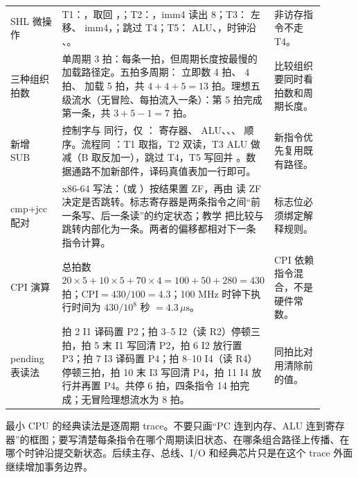 \begin{longtable}{L{0.18\linewidth}L{0.5\linewidth}L{0.22\linewidth}}
SHL 微操作 & T1：，取回 ，；T2：，imm4 读出 8；T3： 左移、 imm4，；跳过 T4；T5： ALU、，时钟沿 、。 & 非访存指令不走 T4。 \\
三种组织拍数 & 单周期 3 拍：每条一拍，但周期长度按最慢的加载路径定。五拍多周期： 立即数 4 拍、 4 拍、 加载 5 拍，共 $4+4+5=13$ 拍。理想五级流水（无冒险、每拍流入一条）：第 5 拍完成第一条，共 $3+5-1=7$ 拍。 & 比较组织要同时看拍数和周期长度。 \\
新增 SUB & 控制字与  同行，仅 ： 寄存器、 ALU、、、 顺序。流程同 ：T1 取指，T2 双读，T3 ALU 做减（B 取反加一），跳过 T4，T5 写回并 。数据通路不加新部件，译码真值表加一行即可。 & 新指令优先复用既有路径。 \\
cmp+jcc 配对 & x86-64 写法：（或 ）按结果置 ZF，再由  读 ZF 决定是否跳转。标志寄存器是两条指令之间“前一条写、后一条读”的约定状态；教学  把比较与跳转内部化为一条。两者的偏移都相对下一条指令计算。 & 标志位必须绑定解释规则。 \\
CPI 演算 & 总拍数 $20\times5+10\times5+70\times4=100+50+280=430$ 拍；$\mathrm{CPI}=430/100=4.3$；100 MHz 时钟下执行时间为 $430/10^{8}$ 秒 $=4.3\,\mu\mathrm{s}$。 & CPI 依赖指令混合，不是硬件常数。 \\
pending 表读法 & 拍 2 I1 译码置 P2；拍 3--5 I2（读 R2）停顿三拍，拍 5 末 I1 写回清 P2，拍 6 I2 放行置 P3；拍 7 I3 译码置 P4；拍 8--10 I4（读 R4）停顿三拍，拍 10 末 I3 写回清 P4，拍 11 I4 放行并再置 P4。共停 6 拍，四条指令 14 拍完成；无冒险理想流水为 8 拍。 & 同拍比对用清除前的值。 \\
\bottomrule
\end{longtable}

\begin{classicnote}
最小 CPU 的经典读法是逐周期 trace。不要只画“PC 连到内存、ALU 连到寄存器”的框图；要写清楚每条指令在哪个周期读旧状态、在哪条组合路径上传播、在哪个时钟沿提交新状态。后续主存、总线、I/O 和经典芯片只是在这个 trace 外面继续增加事务边界。
\end{classicnote}
